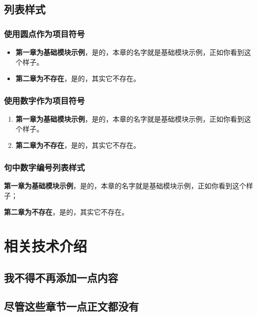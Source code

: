 \documentclass[a4paper,AutoFakeBold,oneside,12pt]{book}
\begin{document}
\section{列表样式}

\subsection{使用圆点作为项目符号}

\begin{itemize}
	\item \textbf{第一章为基础模块示例}，是的，本章的名字就是基础模块示例，正如你看到这个样子。
	\item \textbf{第二章为不存在}，是的，其实它不存在。
\end{itemize}

\subsection{使用数字作为项目符号}

\begin{enumerate}
	\item \textbf{第一章为基础模块示例}，是的，本章的名字就是基础模块示例，正如你看到这个样子。
	\item \textbf{第二章为不存在}，是的，其实它不存在。
\end{enumerate}

\subsection{句中数字编号列表样式}

\begin{enumerate*}
	\item \textbf{第一章为基础模块示例}，是的，本章的名字就是基础模块示例，正如你看到这个样子；
	\item \textbf{第二章为不存在}，是的，其实它不存在。
\end{enumerate*}

\chapter{相关技术介绍}
\section{我不得不再添加一点内容}
\section{尽管这些章节一点正文都没有}
\end{document}
